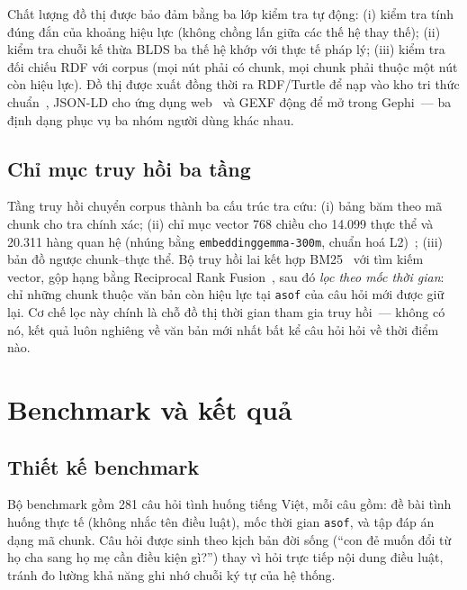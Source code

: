 \documentclass[12pt,a4paper]{report}
\renewcommand{\_}{\textunderscore\allowbreak}
\begin{document}
Chất lượng đồ thị được bảo đảm bằng ba lớp kiểm tra tự động: (i) kiểm tra tính đúng đắn của khoảng hiệu lực (không chồng lấn giữa các thế hệ thay thế); (ii) kiểm tra chuỗi kế thừa BLDS ba thế hệ khớp với thực tế pháp lý; (iii) kiểm tra đối chiếu RDF với corpus (mọi nút phải có chunk, mọi chunk phải thuộc một nút còn hiệu lực). Đồ thị được xuất đồng thời ra RDF/Turtle để nạp vào kho tri thức chuẩn~\cite{rdf11}, JSON-LD cho ứng dụng web~\cite{jsonld} và GEXF động để mở trong Gephi~--- ba định dạng phục vụ ba nhóm người dùng khác nhau.

\section{Chỉ mục truy hồi ba tầng}\label{sec:index}

Tầng truy hồi chuyển corpus thành ba cấu trúc tra cứu: (i) bảng băm theo mã chunk cho tra chính xác; (ii) chỉ mục vector 768 chiều cho 14.099 thực thể và 20.311 hàng quan hệ (nhúng bằng \texttt{embeddinggemma-300m}, chuẩn hoá L2)~\cite{embeddinggemma}; (iii) bản đồ ngược chunk--thực thể. Bộ truy hồi lai kết hợp BM25~\cite{bm25} với tìm kiếm vector, gộp hạng bằng Reciprocal Rank Fusion~\cite{rrf}, sau đó \emph{lọc theo mốc thời gian}: chỉ những chunk thuộc văn bản còn hiệu lực tại \texttt{as\_of} của câu hỏi mới được giữ lại. Cơ chế lọc này chính là chỗ đồ thị thời gian tham gia truy hồi~--- không có nó, kết quả luôn nghiêng về văn bản mới nhất bất kể câu hỏi hỏi về thời điểm nào.

\chapter{Benchmark và kết quả}\label{ch:kq}

\section{Thiết kế benchmark}\label{sec:bench}

Bộ benchmark gồm 281 câu hỏi tình huống tiếng Việt, mỗi câu gồm: đề bài tình huống thực tế (không nhắc tên điều luật), mốc thời gian \texttt{as\_of}, và tập đáp án dạng mã chunk. Câu hỏi được sinh theo kịch bản đời sống (``con đẻ muốn đổi từ họ cha sang họ mẹ cần điều kiện gì?'') thay vì hỏi trực tiếp nội dung điều luật, tránh đo lường khả năng ghi nhớ chuỗi ký tự của hệ thống.
\end{document}
